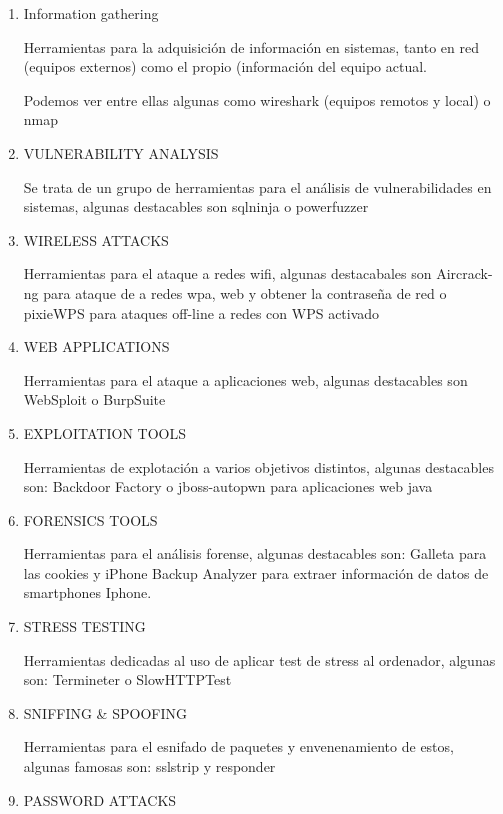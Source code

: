\documentclass[a4paper]{article}
\begin{document}
\begin{enumerate}

\item Information gathering

Herramientas para la adquisición de información en sistemas, tanto en red (equipos externos) como el propio (información del equipo actual. 

Podemos ver entre ellas algunas como wireshark (equipos remotos y local) o nmap


\item VULNERABILITY ANALYSIS

Se trata de un grupo de herramientas para el análisis de vulnerabilidades en sistemas, algunas destacables son sqlninja o powerfuzzer

\item WIRELESS ATTACKS

Herramientas para el ataque a redes wifi, algunas destacabales son Aircrack-ng para ataque de a redes wpa, web y obtener la contraseña de red o pixieWPS para ataques off-line a redes con WPS activado


\item WEB APPLICATIONS

Herramientas para el ataque a aplicaciones web, algunas destacables son WebSploit o BurpSuite

\item EXPLOITATION TOOLS

Herramientas de explotación a varios objetivos distintos, algunas destacables son: Backdoor Factory o jboss-autopwn para aplicaciones web java

\item FORENSICS TOOLS

Herramientas para el análisis forense, algunas destacables son: Galleta para las cookies y iPhone Backup Analyzer para extraer información de datos de smartphones Iphone.

\item STRESS TESTING

Herramientas dedicadas al uso de aplicar test de stress al ordenador, algunas son: Termineter o SlowHTTPTest


\item SNIFFING \& SPOOFING

Herramientas para el esnifado de paquetes y envenenamiento de estos, algunas famosas son: sslstrip y responder

\item PASSWORD ATTACKS


\end{enumerate}
\end{document}
